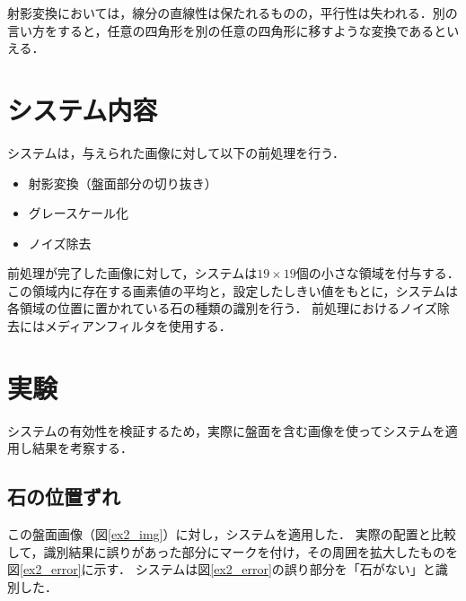 \documentclass[summary]{nitocs}
\numberwithin{equation}{section}
\begin{document}
            射影変換においては，線分の直線性は保たれるものの，平行性は失われる．別の言い方をすると，任意の四角形を別の任意の四角形に移すような変換であるといえる．

    \section{システム内容} \label{system}
        システムは，与えられた画像に対して以下の前処理を行う．
        \begin{itemize}
            \item 射影変換（盤面部分の切り抜き）
            \item グレースケール化
            \item ノイズ除去
        \end{itemize}
        前処理が完了した画像に対して，システムは$19\times19$個の小さな領域を付与する．
        この領域内に存在する画素値の平均と，設定したしきい値をもとに，システムは各領域の位置に置かれている石の種類の識別を行う．
        前処理におけるノイズ除去にはメディアンフィルタを使用する．

    \section{実験} \label{experiment}
        システムの有効性を検証するため，実際に盤面を含む画像を使ってシステムを適用し結果を考察する．
        \subsection{石の位置ずれ} \label{ex2}%
            この盤面画像（図\ref{ex2_img}）に対し，システムを適用した．
            実際の配置と比較して，識別結果に誤りがあった部分にマークを付け，その周囲を拡大したものを図\ref{ex2_error}に示す．
            システムは図\ref{ex2_error}の誤り部分を「石がない」と識別した．
\end{document}
